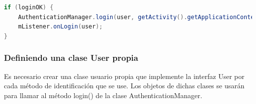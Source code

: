 \begin{lstlisting}[language=Java, frame=tlbr, caption=Ejemplo de como llamar al método onLogin.]	
if (loginOK) {
	AuthenticationManager.login(user, getActivity().getApplicationContext());
	mListener.onLogin(user);
}
\end{lstlisting}



\subsubsection{Definiendo una clase User propia}

Es necesario crear una clase usuario propia que implemente la interfaz User por cada método de identificación que se use. Los objetos de dichas clases se usarán para llamar al método login() de la clase AuthenticationManager.

